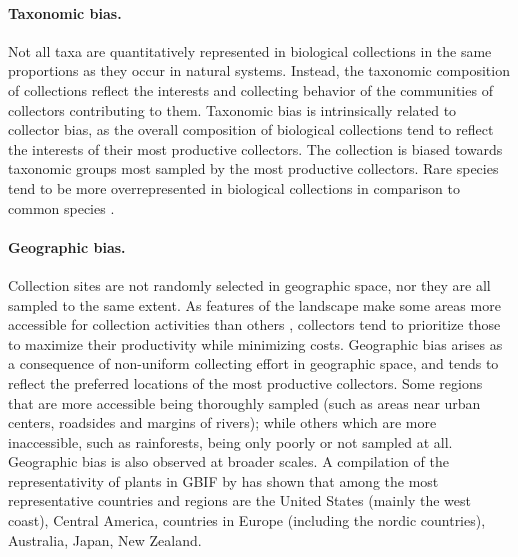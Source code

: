 \paragraph*{Taxonomic bias.}
Not all taxa are quantitatively represented in biological collections in the same proportions as they occur in natural systems.
Instead, the taxonomic composition of collections reflect the interests and collecting behavior of the communities of collectors contributing to them.
Taxonomic bias is intrinsically related to collector bias, as the overall composition of biological collections tend to reflect the interests of their most productive collectors.
The collection is biased towards taxonomic groups most sampled by the most productive collectors.
%
Rare species tend to be more overrepresented in biological collections in comparison to common species \cite{}.
%

\paragraph*{Geographic bias.}
Collection sites are not randomly selected in geographic space, nor they are all sampled to the same extent.
As features of the landscape make some areas more accessible for collection activities than others \cite{Hijmans2000}, collectors tend to prioritize those to maximize their productivity while minimizing costs.
Geographic bias arises as a consequence of non-uniform collecting effort in geographic space, and tends to reflect the preferred locations of the most productive collectors.
Some regions that are more accessible being thoroughly sampled (such as areas near urban centers, roadsides and margins of rivers);
while others which are more inaccessible, such as rainforests, being only poorly or not sampled at all.
%
Geographic bias is also observed at broader scales.
A compilation of the representativity of plants in GBIF by  has shown that among the most representative countries and regions are the United States (mainly the west coast), Central America, countries in Europe (including the nordic countries), Australia, Japan, New Zealand.


